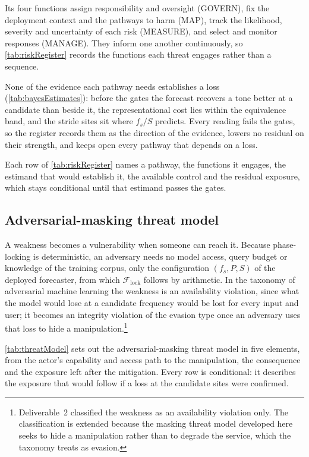 Its four functions assign responsibility and oversight (GOVERN), fix the deployment context and the pathways to harm (MAP), track the likelihood, severity and uncertainty of each risk (MEASURE), and select and monitor responses (MANAGE). They inform one another continuously, so \autoref{tab:riskRegister} records the functions each threat engages rather than a sequence.

None of the evidence each pathway needs establishes a loss (\autoref{tab:bayesEstimates}): before the gates the forecast recovers a tone better at a candidate than beside it, the representational cost lies within the equivalence band, and the stride sites sit where $f_s/S$ predicts. Every reading fails the gates, so the register records them as the direction of the evidence, lowers no residual on their strength, and keeps open every pathway that depends on a loss.

Each row of \autoref{tab:riskRegister} names a pathway, the functions it engages, the estimand that would establish it, the available control and the residual exposure, which stays conditional until that estimand passes the gates.



\subsection{Adversarial-masking threat model}
A weakness becomes a vulnerability when someone can reach it. Because phase-locking is deterministic, an adversary needs no model access, query budget or knowledge of the training corpus, only the configuration $(f_s,P,S)$ of the deployed forecaster, from which $\mathcal F_{\mathrm{lock}}$ follows by arithmetic. In the taxonomy of adversarial machine learning\autocite{vassilevAdversarialMachineLearning2024} the weakness is an availability violation, since what the model would lose at a candidate frequency would be lost for every input and user; it becomes an integrity violation of the evasion type once an adversary uses that loss to hide a manipulation.\footnote{Deliverable~2 classified the weakness as an availability violation only. The classification is extended because the masking threat model developed here seeks to hide a manipulation rather than to degrade the service, which the taxonomy treats as evasion.}

\autoref{tab:threatModel} sets out the adversarial-masking threat model in five elements, from the actor's capability and access path to the manipulation, the consequence and the exposure left after the mitigation. Every row is conditional: it describes the exposure that would follow if a loss at the candidate sites were confirmed.

